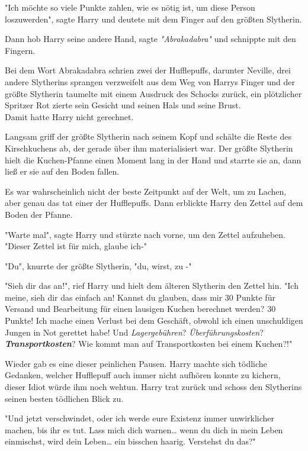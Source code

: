 {"Ich möchte so viele Punkte zahlen, wie es nötig ist, um diese Person loszuwerden", sagte Harry und deutete mit dem Finger auf den größten Slytherin.

Dann hob Harry seine andere Hand, sagte \emph{"Abrakadabra"} und schnippte mit den Fingern.

Bei dem Wort Abrakadabra schrien zwei der Hufflepuffs, darunter Neville, drei andere Slytherins sprangen verzweifelt aus dem Weg von Harrys Finger und der größte Slytherin taumelte mit einem Ausdruck des Schocks zurück, ein plötzlicher Spritzer Rot zierte sein Gesicht und seinen Hals und seine Brust.\\ Damit hatte Harry nicht gerechnet.

Langsam griff der größte Slytherin nach seinem Kopf und schälte die Reste des Kirschkuchens ab, der gerade über ihm materialisiert war. Der größte Slytherin hielt die Kuchen-Pfanne einen Moment lang in der Hand und starrte sie an, dann ließ er sie auf den Boden fallen.

Es war wahrscheinlich nicht der beste Zeitpunkt auf der Welt, um zu Lachen, aber genau das tat einer der Hufflepuffs. Dann erblickte Harry den Zettel auf dem Boden der Pfanne.

"Warte mal", sagte Harry und stürzte nach vorne, um den Zettel aufzuheben. "Dieser Zettel ist für mich, glaube ich-"

"Du", knurrte der größte Slytherin, "du, wirst, zu -"

"Sieh dir das an!", rief Harry und hielt dem älteren Slytherin den Zettel hin. "Ich meine, sieh dir das einfach an! Kannst du glauben, dass mir 30 Punkte für Versand und Bearbeitung für einen lausigen Kuchen berechnet werden? 30 Punkte! Ich mache einen Verlust bei dem Geschäft, obwohl ich einen unschuldigen Jungen in Not gerettet habe! Und \emph{Lagergebühren}? \emph{Überführungskosten}? \textbf{\emph{Transportkosten}}? Wie kommt man auf Transportkosten bei einem Kuchen?!"

Wieder gab es eine dieser peinlichen Pausen. Harry machte sich tödliche Gedanken, welcher Hufflepuff auch immer nicht aufhören konnte zu kichern, dieser Idiot würde ihm noch wehtun. Harry trat zurück und schoss den Slytherins seinen besten tödlichen Blick zu.

"Und jetzt verschwindet, oder ich werde eure Existenz immer unwirklicher machen, bis ihr es tut. Lass mich dich warnen… wenn du dich in mein Leben einmischst, wird dein Leben… ein bisschen haarig. Verstehst du das?"

}
